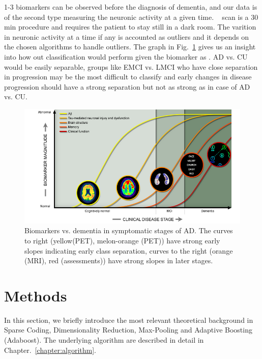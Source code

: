 1-3 biomarkers can be observed before the diagnosis of dementia, and our data is of the second type measuring the neuronic activity at a given time. \FDGPET~ scan is a 30 min procedure and requires the patient to stay still in a dark room. The varition in neuronic activity at a time if any is accounted as outliers and it depends on the chosen algorithms to handle outliers. The graph in Fig.~\ref{fig:biomarker} gives us an insight into how out classification would perform given the biomarker as \FDGPET. AD vs. CU would be easily separable, groups like EMCI vs. LMCI who have close separation in progression may be the most difficult to classify and early changes in disease progression should have a strong separation but not as strong as in case of AD vs. CU.        

\begin{figure}[h]
	\centering
	\includegraphics[width=\linewidth]{figures/biomarker}
	\caption[Biomarkers vs. dementia]{Biomarkers vs. dementia in symptomatic stages of AD. The curves to right (yellow(PET), melon-orange (PET)) have strong early slopes indicating early class separation, curves to the right (orange (MRI), red (assessments)) have strong slopes in later stages.}
	\label{fig:biomarker}
\end{figure}


\section{Methods}
\label{sec:theoritical_background}

In this section, we briefly introduce the most relevant theoretical background in Sparse Coding, Dimensionality Reduction, Max-Pooling and Adaptive Boosting (Adaboost). The underlying algorithm are described in detail in Chapter.~\ref{chapter:algorithm}.

